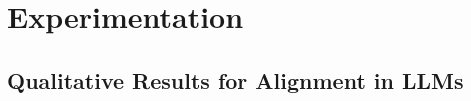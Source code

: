 \section{Experimentation}
\label{sec:propwork-atpo-exp}

\subsection{Qualitative Results for Alignment in LLMs}

%
%
%
%
%
%
%
%
